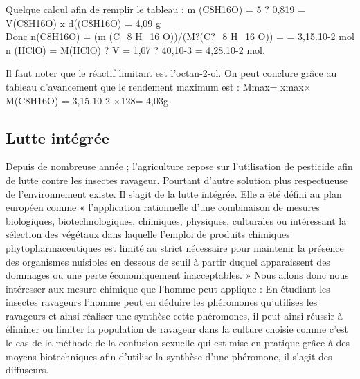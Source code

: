 Quelque calcul afin de remplir le tableau : m (C8H16O) = 5 ? 0,819 =
V(C8H16O) x d((C8H16O) = 4,09 g\\Donc n(C8H16O) = (m (C\_8 H\_16
O))/(M?(C?\_8 H\_16 O)) = = 3,15.10-2 mol n (HClO) = M(HClO) ? V = 1,07
? 40,10-3 = 4,28.10-2 mol.

Il faut noter que le réactif limitant est l'octan-2-ol. On peut conclure
grâce au tableau d'avancement que le rendement maximum est : Mmax= xmax×
M(C8H16O) = 3,15.10-2 ×128= 4,03g

\subsection{Lutte intégrée}

Depuis de nombreuse année ; l'agriculture repose sur l'utilisation de
pesticide afin de lutte contre les insectes ravageur. Pourtant d'autre
solution plus respectueuse de l'environnement existe. Il s'agit de la
lutte intégrée. Elle a été défini au plan européen comme « l'application
rationnelle d'une combinaison de mesures biologiques, biotechnologiques,
chimiques, physiques, culturales ou intéressant la sélection des
végétaux dans laquelle l'emploi de produits chimiques
phytopharmaceutiques est limité au strict nécessaire pour maintenir la
présence des organismes nuisibles en dessous de seuil à partir duquel
apparaissent des dommages ou une perte économiquement inacceptables. »
Nous allons donc nous intéresser aux mesure chimique que l'homme peut
applique : En étudiant les insectes ravageurs l'homme peut en déduire
les phéromones qu'utilises les ravageurs et ainsi réaliser une synthèse
cette phéromones, il peut ainsi réussir à éliminer ou limiter la
population de ravageur dans la culture choisie comme c'est le cas de la
méthode de la confusion sexuelle qui est mise en pratique grâce à des
moyens biotechniques afin d'utilise la synthèse d'une phéromone, il
s'agit des diffuseurs.

